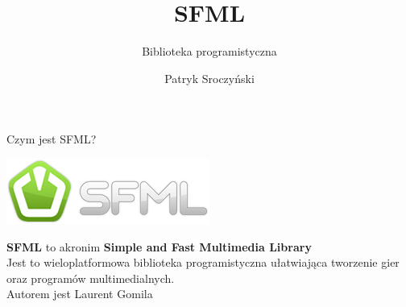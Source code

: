 \documentclass[12pt]{beamer}
\title{\Huge{SFML}}
\subtitle{Biblioteka programistyczna}
\author{Patryk Sroczyński}
\institute{\large\textbf{Politechnika Śląska} \\
    Gliwice}
\date{}
\begin{document}



    \begin{frame}

        \titlepage

    \end{frame}



    \begin{frame}[t]{Czym jest SFML?}\vspace{20pt}

        \begin{center}
            \includegraphics[scale=0.5]{textures/logo.png} \\[20pt]
        \end{center}
        

        \textbf{SFML} to akronim \textbf{Simple and Fast Multimedia Library} \\[20pt]

        Jest to wieloplatformowa biblioteka programistyczna ułatwiająca tworzenie gier
        oraz programów multimedialnych. \\[20pt]

        Autorem jest Laurent Gomila

    \end{frame}
\end{document}
